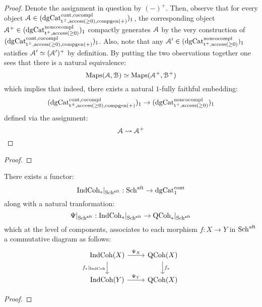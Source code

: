                     \begin{proof}
                        Denote the assignment in question by $(-)^+$. Then, observe that for every object $\mathcal{A} \in (\mathrm{dg}\mathrm{Cat}^{\mathrm{cont}, \mathrm{co}\mathrm{compl}}_{\mathrm{t}^{\pm}, \mathrm{access}(\geq 0), \mathrm{comp}\mathrm{gen}(+)})_1$, the corresponding object $\mathcal{A}^+ \in (\mathrm{dg}\mathrm{Cat}^{\mathrm{non}\mathrm{co}\mathrm{compl}}_{\mathrm{t}^+, \mathrm{access}(\geq 0)})_1$ compactly generates $\mathcal{A}$ by the very construction of $(\mathrm{dg}\mathrm{Cat}^{\mathrm{cont}, \mathrm{co}\mathrm{compl}}_{\mathrm{t}^{\pm}, \mathrm{access}(\geq 0), \mathrm{comp}\mathrm{gen}(+)})_1$. Also, note that any $\mathcal{A}' \in (\mathrm{dg}\mathrm{Cat}^{\mathrm{non}\mathrm{co}\mathrm{compl}}_{\mathrm{t}^+, \mathrm{access}(\geq 0)})_1$ satisfies $\mathcal{A}' \simeq (\mathcal{A}')^+$ by definition. By putting the two observations together one sees that there is a natural equivalence:
                            $$\mathrm{Maps}(\mathcal{A}, \mathcal{B}) \simeq \mathrm{Maps}(\mathcal{A}^+, \mathcal{B}^+)$$
                        which implies that indeed, there exists a natural $1$-fully faithful embedding:
                            $$(\mathrm{dg}\mathrm{Cat}^{\mathrm{cont}, \mathrm{co}\mathrm{compl}}_{\mathrm{t}^{\pm}, \mathrm{access}(\geq 0), \mathrm{comp}\mathrm{gen}(+)})_1 \to (\mathrm{dg}\mathrm{Cat}^{\mathrm{non}\mathrm{co}\mathrm{compl}}_{\mathrm{t}^+, \mathrm{access}(\geq 0)})_1$$
                        defined via the assignment:
                            $$\mathcal{A} \leadsto \mathcal{A}^+$$
                    \end{proof}
                \begin{lemma}
                    
                \end{lemma}
                    \begin{proof}
                        
                    \end{proof}
                \begin{theorem} \label{theorem: indcoh_functoriality}
                    There exists a functor:
                        $$\mathrm{Ind}\mathrm{Coh}_*|_{\mathrm{Sch}^{\mathrm{aft}}}: \mathrm{Sch}^{\mathrm{aft}} \to \mathrm{dg}\mathrm{Cat}^{\mathrm{cont}}_1$$
                    along with a natural tranformation:
                        $$\Psi|_{\mathrm{Sch}^{\mathrm{aft}}}: \mathrm{Ind}\mathrm{Coh}_*|_{\mathrm{Sch}^{\mathrm{aft}}} \to \mathrm{QCoh}_*|_{\mathrm{Sch}^{\mathrm{aft}}}$$
                    which at the level of components, associates to each morphism $f: X \to Y$ in $\mathrm{Sch}^{\mathrm{aft}}$ a commutative diagram as follows:
                        $$
                            \begin{tikzcd}
                            	{\Ind\Coh(X)} & {\QCoh(X)} \\
                            	{\Ind\Coh(Y)} & {\QCoh(X)}
                            	\arrow["{\Psi_X}", from=1-1, to=1-2]
                            	\arrow["{f_*|_{\Ind\Coh}}"', from=1-1, to=2-1]
                            	\arrow["{f_*}", from=1-2, to=2-2]
                            	\arrow["{\Psi_Y}", from=2-1, to=2-2]
                            \end{tikzcd}
                        $$
                \end{theorem}
                    \begin{proof}
                        
                    \end{proof}
    
